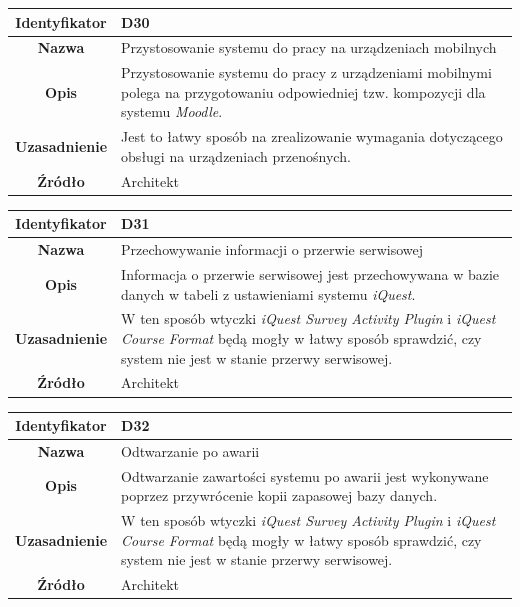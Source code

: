 \begin{table}[H]
\centering
\begin{tabular}{ | >{\bfseries}c | p{11cm} | }
\hline
%
Identyfikator & D30 \\ \hline
Nazwa & Przystosowanie systemu do pracy na urządzeniach mobilnych \\ \hline
Opis & Przystosowanie systemu do pracy z urządzeniami mobilnymi polega na przygotowaniu odpowiedniej tzw. kompozycji dla systemu \textit{Moodle}. \\ \hline
Uzasadnienie & Jest to łatwy sposób na zrealizowanie wymagania dotyczącego obsługi na urządzeniach przenośnych. \\ \hline
Źródło & Architekt \\ \hline
%
\end{tabular}
\end{table}

\begin{table}[H]
\centering
\begin{tabular}{ | >{\bfseries}c | p{11cm} | }
\hline
%
Identyfikator & D31 \\ \hline
Nazwa & Przechowywanie informacji o przerwie serwisowej \\ \hline
Opis & Informacja o przerwie serwisowej jest przechowywana w bazie danych w tabeli z ustawieniami systemu \textit{iQuest}. \\ \hline
Uzasadnienie & W ten sposób wtyczki \textit{iQuest Survey Activity Plugin} i \textit{iQuest Course Format} będą mogły w łatwy sposób sprawdzić, czy system nie jest w stanie przerwy serwisowej. \\ \hline
Źródło & Architekt \\ \hline
%
\end{tabular}
\end{table}

\begin{table}[H]
\centering
\begin{tabular}{ | >{\bfseries}c | p{11cm} | }
\hline
%
Identyfikator & D32 \\ \hline
Nazwa & Odtwarzanie po awarii \\ \hline
Opis & Odtwarzanie zawartości systemu po awarii jest wykonywane poprzez przywrócenie kopii zapasowej bazy danych. \\ \hline
Uzasadnienie & W ten sposób wtyczki \textit{iQuest Survey Activity Plugin} i \textit{iQuest Course Format} będą mogły w łatwy sposób sprawdzić, czy system nie jest w stanie przerwy serwisowej. \\ \hline
Źródło & Architekt \\ \hline
%
\end{tabular}
\end{table}


